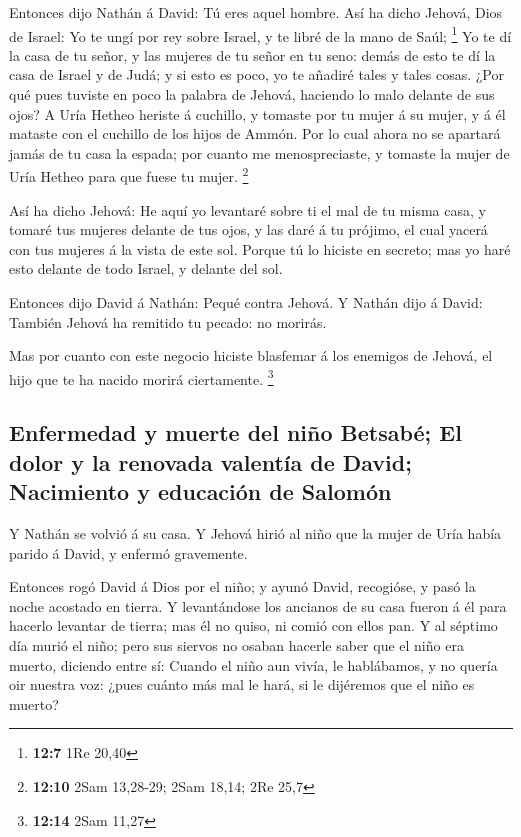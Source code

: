  Entonces dijo Nathán á David: Tú eres aquel hombre. Así ha
dicho Jehová, Dios de Israel: Yo te ungí por rey sobre Israel, y te
libré de la mano de Saúl; \footnote{\textbf{12:7} 1Re 20,40}
 Yo te dí la casa de tu señor, y las mujeres de tu señor en
tu seno: demás de esto te dí la casa de Israel y de Judá; y si esto es
poco, yo te añadiré tales y tales cosas.  ¿Por qué pues
tuviste en poco la palabra de Jehová, haciendo lo malo delante de sus
ojos? A Uría Hetheo heriste á cuchillo, y tomaste por tu mujer á su
mujer, y á él mataste con el cuchillo de los hijos de Ammón.
 Por lo cual ahora no se apartará jamás de tu casa la
espada; por cuanto me menospreciaste, y tomaste la mujer de Uría Hetheo
para que fuese tu mujer. \footnote{\textbf{12:10} 2Sam 13,28-29; 2Sam
  18,14; 2Re 25,7}

 Así ha dicho Jehová: He aquí yo levantaré sobre ti el mal
de tu misma casa, y tomaré tus mujeres delante de tus ojos, y las daré á
tu prójimo, el cual yacerá con tus mujeres á la vista de este sol.
 Porque tú lo hiciste en secreto; mas yo haré esto delante
de todo Israel, y delante del sol.

 Entonces dijo David á Nathán: Pequé contra Jehová. Y
Nathán dijo á David: También Jehová ha remitido tu pecado: no morirás.

 Mas por cuanto con este negocio hiciste blasfemar á los
enemigos de Jehová, el hijo que te ha nacido morirá ciertamente.
\footnote{\textbf{12:14} 2Sam 11,27}

\hypertarget{enfermedad-y-muerte-del-niuxf1o-betsabuxe9-el-dolor-y-la-renovada-valentuxeda-de-david-nacimiento-y-educaciuxf3n-de-salomuxf3n}{%
\subsection{Enfermedad y muerte del niño Betsabé; El dolor y la renovada
valentía de David; Nacimiento y educación de
Salomón}\label{enfermedad-y-muerte-del-niuxf1o-betsabuxe9-el-dolor-y-la-renovada-valentuxeda-de-david-nacimiento-y-educaciuxf3n-de-salomuxf3n}}

 Y Nathán se volvió á su casa. Y Jehová hirió al niño que
la mujer de Uría había parido á David, y enfermó gravemente.

 Entonces rogó David á Dios por el niño; y ayunó David,
recogióse, y pasó la noche acostado en tierra.  Y
levantándose los ancianos de su casa fueron á él para hacerlo levantar
de tierra; mas él no quiso, ni comió con ellos pan.  Y al
séptimo día murió el niño; pero sus siervos no osaban hacerle saber que
el niño era muerto, diciendo entre sí: Cuando el niño aun vivía, le
hablábamos, y no quería oir nuestra voz: ¿pues cuánto más mal le hará,
si le dijéremos que el niño es muerto?

